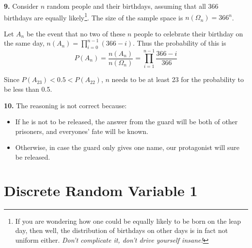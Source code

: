 \documentclass[a4paper,12pt]{article}
\newcommand{\exercise}[1]{\noindent\textbf{#1.}}
\begin{document}
\exercise 9  Consider $n$ random people and their birthdays, assuming
that all 366 birthdays are equally likely\footnote{If you are wondering
how one could be equally likely to be born on the leap day, then well,
the distribution of birthdays on other days is in fact not uniform either.
\textit{Don't complicate it, don't drive yourself insane!}}.
The size of the sample space is $n(\Omega_n) = 366^n$.

Let $A_n$ be the event that no two of these $n$ people to celebrate
their birthday on the same day, $n(A_n) = \prod_{i=0}^{n-1}(366-i)$.
Thus the probability of this is
\[P(A_n) = \frac{n(A_n)}{n(\Omega_n)} = \prod_{i=1}^{n-1}\frac{366 - i}{366}\]

Since $P(A_{23}) < 0.5 < P(A_{22})$, $n$ needs to be at least 23
for the probability to be less than 0.5.

\exercise{10} The reasoning is not correct because:
\begin{itemize}
  \item If he is not to be released, the answer from the guard will be
    both of other prisoners, and everyones' fate will be known.
  \item Otherwise, in case the guard only gives one name,
    our protagonist will sure be released.
\end{itemize}
\pagebreak

\section{Discrete Random Variable 1}
\end{document}
